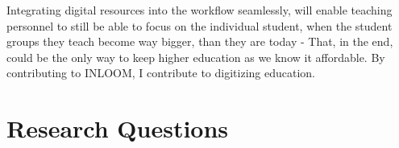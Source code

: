 Integrating digital resources into the workflow seamlessly, will enable teaching 
personnel to still be able to focus on the individual student, when the student
groups they teach become way bigger, than they are today - That, in the end, could be
the only way to keep higher education as we know it affordable. By contributing to 
INLOOM, I contribute to digitizing education.

\section[Research Questions]{Research Questions}
